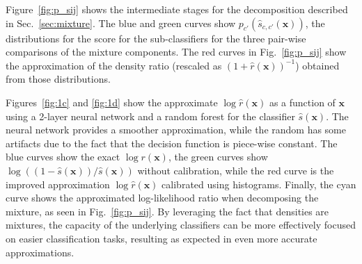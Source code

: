 \documentclass[12pt]{article}
\numberwithin{equation}{section}
\theoremstyle{plain}
\begin{document}
Figure~\ref{fig:p_sij} shows the intermediate stages for the decomposition described in Sec.~\ref{sec:mixture}.
The blue and green curves show $p_{c'}(\hat{s}_{c,c'}(\mathbf{x}))$,  the distributions for the score for the sub-classifiers for the three pair-wise comparisons of the mixture components. The red curves in Fig.~\ref{fig:p_sij} show the approximation of the density ratio (rescaled as $(1 +
\hat{r}(\mathbf{x}))^{-1}$) obtained from those distributions.


Figures~\ref{fig:1c} and \ref{fig:1d} show the approximate $\log  \hat{r}(\mathbf{x}) $ as a function of $\mathbf{x}$ using a
2-layer neural network and a random forest for the classifier $\hat{s}(\mathbf{x})$.
The neural network provides a smoother approximation, while the random has some artifacts due to the fact that the
decision function is piece-wise constant.
The blue curves show the exact $\log {r}(\mathbf{x})$, the green curves show
$\log \left( (1-\hat s(\mathbf{x}))/\hat s(\mathbf{x}) \right)$
without calibration, while the red curve is the improved approximation $\log \hat{r}(\mathbf{x})$ calibrated
using histograms. Finally, the cyan curve shows the approximated log-likelihood ratio when decomposing the mixture, as
seen in Fig.~\ref{fig:p_sij}.  By leveraging the fact that densities are mixtures, the capacity
of the underlying classifiers can be more effectively focused on easier classification tasks,
resulting as expected in even more accurate approximations.
\end{document}

